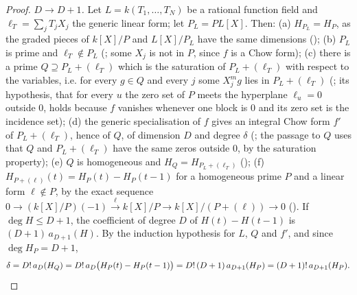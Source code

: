 \begin{proof}
\emph{$D\to D+1$.} Let $L=k(T_1,\dots,T_N)$ be a rational function field and $\ell_T=\sum_jT_jX_j$ the generic
linear form; let $P_L=PL[X]$. Then:
(a) $H_{P_L}=H_P$, as the graded pieces of $k[X]/P$ and $L[X]/P_L$ have the same dimensions
();
(b) $P_L$ is prime and $\ell_T\notin P_L$ (;
some $X_j$ is not in $P$, since $f$ is a Chow form);
(c) there is a prime $Q\supseteq P_L+(\ell_T)$ which is the saturation of $P_L+(\ell_T)$ with respect to the
variables, i.e. for every $g\in Q$ and every $j$ some $X_j^mg$ lies in $P_L+(\ell_T)$
(; its hypothesis, that for every $u$ the
zero set of $P$ meets the hyperplane $\ell_u=0$ outside $0$, holds because $f$ vanishes whenever one block
is $0$ and its zero set is the incidence set);
(d) the generic specialisation of $f$ gives an integral Chow form $f'$ of $P_L+(\ell_T)$, hence of $Q$, of
dimension $D$ and degree $\delta$ (;
the passage to $Q$ uses that $Q$ and $P_L+(\ell_T)$ have the same zeros outside $0$, by the saturation
property);
(e) $Q$ is homogeneous and $H_Q=H_{P_L+(\ell_T)}$
();
(f) $H_{P+(\ell)}(t)=H_P(t)-H_P(t-1)$ for a homogeneous prime $P$ and a linear form $\ell\notin P$, by the
exact sequence $0\to(k[X]/P)(-1)\xrightarrow{\ell}k[X]/P\to k[X]/(P+(\ell))\to0$
().
If $\deg H\le D+1$, the coefficient of degree $D$ of $H(t)-H(t-1)$ is $(D+1)\,a_{D+1}(H)$. By the induction
hypothesis for $L$, $Q$ and $f'$, and since $\deg H_P=D+1$,
\[
\delta=D!\,a_D(H_Q)=D!\,a_D\bigl(H_P(t)-H_P(t-1)\bigr)=D!\,(D+1)\,a_{D+1}(H_P)=(D+1)!\,a_{D+1}(H_P).\qedhere
\]
\end{proof}

